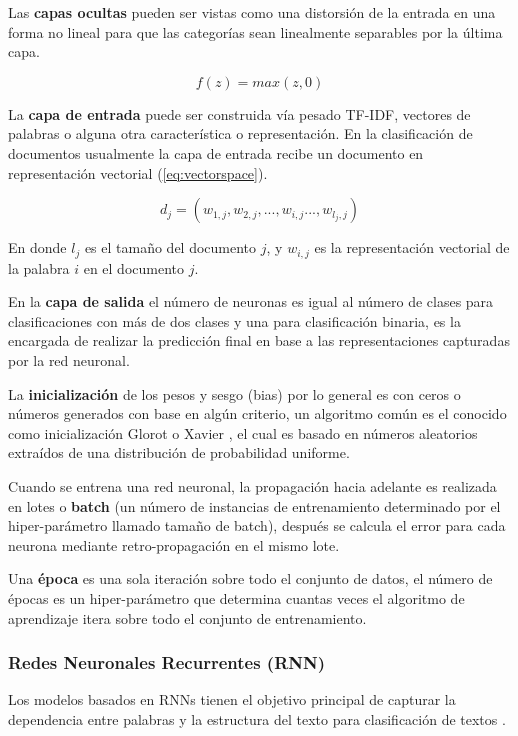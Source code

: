 Las\textbf{ capas ocultas} pueden ser vistas como una distorsión de la entrada en una forma no lineal para que las categorías sean linealmente separables por la última capa.

\begin{equation} \label{eq:RELU}
    f(z)= max(z,0)
\end{equation}

La \textbf{capa de entrada} puede ser construida vía pesado TF-IDF, vectores de palabras o alguna otra característica o representación. En la clasificación de documentos usualmente la capa de entrada recibe un documento en representación vectorial (\ref{eq:vectorspace}).

\begin{equation} \label{eq:vectorspace}
d_{j} = (w_{1,j},w_{2,j},...,w_{i,j}...,w_{l_{j},j})
\end{equation}

En donde $l_{j}$ es el tamaño del documento $j$, y $w_{i,j}$ es la representación vectorial de la palabra $i$ en el documento $j$.

En la \textbf{capa de salida} el número de neuronas es igual al número de clases para clasificaciones con más de dos clases y una para clasificación binaria, es la encargada de realizar la predicción final en base a las representaciones capturadas por la red neuronal.

La \textbf{inicialización} de los pesos y sesgo (bias) por lo general es con ceros o números generados con base en algún criterio, un algoritmo común es el conocido como inicialización Glorot o Xavier \citep{glorot2010understanding}, el cual es basado en números aleatorios extraídos de una distribución de probabilidad uniforme.

Cuando se entrena una red neuronal, la propagación hacia adelante es realizada en lotes o \textbf{batch} (un número de instancias de entrenamiento determinado por el hiper-parámetro llamado tamaño de batch), después se calcula el error para cada neurona mediante retro-propagación en el mismo lote. 

Una \textbf{época} es una sola iteración sobre todo el conjunto de datos, el número de épocas es un hiper-parámetro que determina cuantas veces el algoritmo de aprendizaje itera sobre todo el conjunto de entrenamiento.


\subsubsection{Redes Neuronales Recurrentes (RNN)}
Los modelos basados en RNNs tienen el objetivo principal de capturar la dependencia entre palabras y la estructura del texto para clasificación de textos \cite{goodfellow2016deep}.

